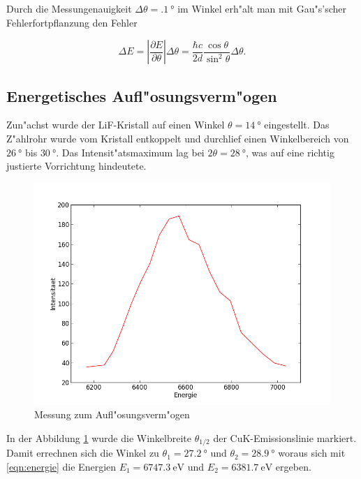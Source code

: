 	Durch die Messungenauigkeit $\Delta \theta = \SI{.1}{\degree}$ im Winkel erh"alt man mit Gau"s'scher Feh\-ler\-fort\-pflanz\-ung den Fehler

	\begin{equation}
		\Delta E = \left| \frac{\partial E}{\partial \theta} \right| \Delta \theta = 
		\frac{\hbar c}{2 d} \frac{\cos{\theta}}{\sin^2{\theta}} \Delta \theta . \nonumber
	\end{equation}

	\subsection{Energetisches Aufl"osungsverm"ogen}
		\label{subsec:aufloesung}

		Zun"achst wurde der LiF-Kristall auf einen Winkel $\theta = \SI{14}{\degree}$ eingestellt.
		Das Z"ahlrohr wurde vom Kristall entkoppelt und durchlief einen Winkelbereich von $\SI{26}{\degree}$ bis $\SI{30}{\degree}$.
		Das Intensit"atsmaximum lag bei $2\theta = \SI{28}{\degree}$, was auf eine richtig justierte Vorrichtung hin\-deu\-te\-te.

		\begin{figure}[h!]
			\centering
			\includegraphics[width = 15cm]{fits/graph_adjust.png}
			\caption{Messung zum Aufl"osungsverm"ogen}
			\label{fig:aufloesung}
		\end{figure}

		In der Abbildung \ref{fig:aufloesung} wurde die Winkelbreite $\theta_{1/2}$ der CuK-Emissionslinie markiert.
		Damit errechnen sich die Winkel zu $\theta_1 = \SI{27.2}{\degree}$ und $\theta_2 = \SI{28.9}{\degree}$ woraus sich mit \eqref{eqn:energie} die Energien $E_1 = \SI{6747.3}{\electronvolt}$ und $E_2 = \SI{6381.7}{\electronvolt}$ ergeben.

